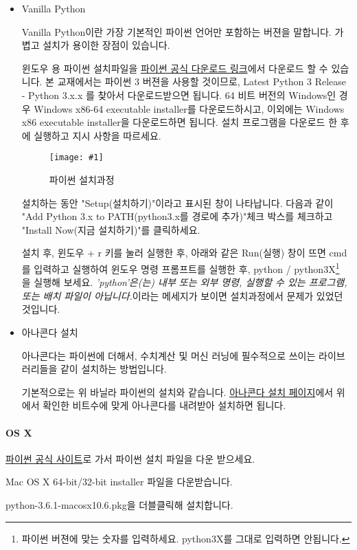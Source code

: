 \documentclass[twoside]{article}
\newcommand\fig[2]{
\begin{figure}[h]
  \centering
  \texttt{[image: \#1]}
  \caption{#2} 
  \label{fig:#1}
\end{figure}
}
\begin{document}
\begin{itemize} 
\item Vanilla Python 

Vanilla Python이란 가장 기본적인 파이썬 언어만 포함하는 버젼을 말합니다. 가볍고 설치가 용이한 장점이 있습니다. 

윈도우 용 파이썬 설치파일을 \href{https://www.python.org/downloads/windows/}{파이썬 공식 다운로드 링크}에서 다운로드 할 수 있습니다. 본 교재에서는 파이썬 3 버젼을 사용할 것이므로, Latest Python 3 Release - Python 3.x.x 를 찾아서 다운로드받으면 됩니다. 64 비트 버전의 Windows인 경우 Windows x86-64 executable installer를 다운로드하시고, 이외에는 Windows x86 executable installer을 다운로드하면 됩니다. 설치 프로그램을 다운로드 한 후에 실행하고 지시 사항을 따르세요. 

\fig{python-install1}{파이썬 설치과정} 

설치하는 동안 "Setup(설치하기)"이라고 표시된 창이 나타납니다. 다음과 같이 "Add Python 3.x to PATH(python3.x를 경로에 추가)"체크 박스를 체크하고 "Install Now(지금 설치하기)"를 클릭하세요.

설치 후, 윈도우 + r 키를 눌러 실행한 후, 아래와 같은 Run(실행) 창이 뜨면 cmd를 입력하고 실행하여 윈도우 명령 프롬프트를 실행한 후, python / python3X\footnote{파이썬 버젼에 맞는 숫자를 입력하세요. python3X를 그대로 입력하면 안됩니다.} 을 실행해 보세요. \textit{'python'은(는) 내부 또는 외부 명령, 실행할 수 있는 프로그램, 또는 배치 파일이 아닙니다.}이라는 메세지가 보이면 설치과정에서 문제가 있었던 것입니다. 

\item 아나콘다 설치 

아나콘다는 파이썬에 더해서, 수치계산 및 머신 러닝에 필수적으로 쓰이는 라이브러리들을 같이 설치하는 방법입니다. 

기본적으로는 위 바닐라 파이썬의 설치와 같습니다. \href{https://www.anaconda.com/download/}{아나콘다 설치 페이지}에서 위에서 확인한 비트수에 맞게 아나콘다를 내려받아 설치하면 됩니다. 

\end{itemize}

\paragraph{OS X} 

\href{https://www.python.org/downloads/}{파이썬 공식 사이트}로 가서 파이썬 설치 파일을 다운 받으세요. 

\begin{compactitem}
\item Mac OS X 64-bit/32-bit installer 파일을 다운받습니다.
\item python-3.6.1-macosx10.6.pkg을 더블클릭해 설치합니다.
\end{compactitem}
\end{document}
